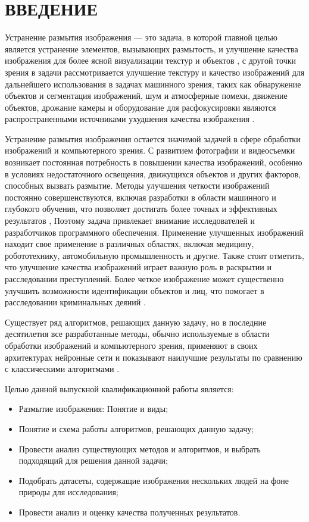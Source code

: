 \part*{ВВЕДЕНИЕ}

Устранение размытия изображения — это задача, в которой главной целью является устранение элементов, вызывающих размытость, и улучшение качества изображения для более ясной визуализации текстур и объектов \cite{shen2018deep}, с другой точки зрения в задачи рассмотривается улучшение текстуру и качество изображений для дальнейшего использования в задачах машинного зрения, таких как обнаружение объектов и сегментация изображений, шум и атмосферные помехи, движение объектов, дрожание камеры и оборудование для расфокусировки являются распространенными источниками ухудшения качества изображения \cite{NIPS2009_3dd48ab3}.

Устранение размытия изображения остается значимой задачей в сфере обработки изображений и компьютерного зрения. С развитием фотографии и видеосъемки возникает постоянная потребность в повышении качества изображений, особенно в условиях недостаточного освещения, движущихся объектов и других факторов, способных вызвать размытие. Методы улучшения четкости изображений постоянно совершенствуются, включая разработки в области машинного и глубокого обучения, что позволяет достигать более точных и эффективных результатов \cite{Lian2023}, Поэтому задача привлекает внимание исследователей и разработчиков программного обеспечения. Применение улучшенных изображений находит свое применение в различных областях, включая медицину, робототехнику, автомобильную промышленность и другие. Также стоит отметить, что улучшение качества изображений играет важную роль в раскрытии и расследовании преступлений. Более четкое изображение может существенно улучшить возможности идентификации объектов и лиц, что помогает в расследовании криминальных деяний \cite{sun2010}.

Существует ряд алгоритмов, решающих данную задачу, но в последние десятилетия все разработанные методы, обычно используемые в области обработки изображений и компьютерного зрения, применяют в своих архитектурах нейронные сети и показывают наилучшие результаты по сравнению с классическими алгоритмами \cite{zhang2022deep}. 

Целью данной выпускной квалификационной работы является:

\begin{itemize}
    \item Размытие изображения: Понятие и виды;
    \item Понятие и схема работы алгоритмов, решающих данную задачу;
    \item Провести анализ существующих методов и алгоритмов, и выбрать подходящий для решения данной задачи;
    \item Подобрать датасеты, содержащие изображения нескольких людей на фоне природы для исследования;
    \item Провести анализ и оценку качества полученных результатов. 
\end{itemize}